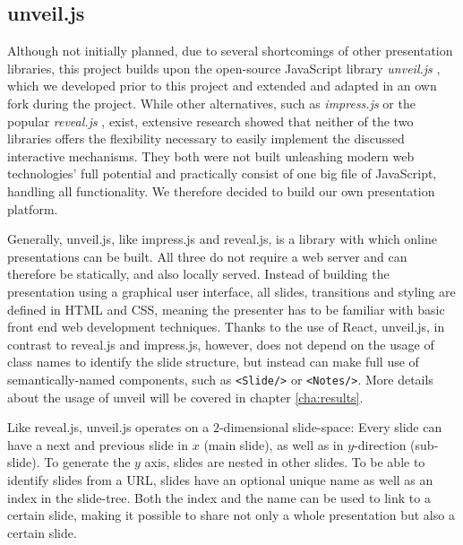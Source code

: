 \subsection{unveil.js}
\label{sec:implementation-technologies-unveil}
Although not initially planned, due to several shortcomings of other presentation libraries, this project builds upon the open-source JavaScript library \emph{unveil.js} \cite{unveil}, which we developed prior to this project and extended and adapted in an own fork \cite{unveil-fork} during the project. While other alternatives, such as \emph{impress.js} \cite{impressjs} or the popular \emph{reveal.js} \cite{revealjs}, exist, extensive research showed that neither of the two libraries offers the flexibility necessary to easily implement the discussed interactive mechanisms. They both were not built unleashing modern web technologies' full potential and practically consist of one big file of JavaScript, handling all functionality. We therefore decided to build our own presentation platform.

Generally, unveil.js, like impress.js and reveal.js, is a library with which online presentations can be built. All three do not require a web server and can therefore be statically, and also locally served. Instead of building the presentation using a graphical user interface, all slides, transitions and styling are defined in HTML and CSS, meaning the presenter has to be familiar with basic front end web development techniques. Thanks to the use of React, unveil.js, in contrast to reveal.js and impress.js, however, does not depend on the usage of class names to identify the slide structure, but instead can make full use of semantically-named components, such as \texttt{<Slide/>} or \texttt{<Notes/>}. More details about the usage of unveil will be covered in chapter \ref{cha:results}.

Like reveal.js, unveil.js operates on a $2$-dimensional slide-space: Every slide can have a next and previous slide in $x$ (main slide), as well as in $y$-direction (sub-slide). To generate the $y$ axis, slides are nested in other slides.
To be able to identify slides from a URL, slides have an optional unique name as well as an index in the slide-tree. Both the index and the name can be used to link to a certain slide, making it possible to share not only a whole presentation but also a certain slide.

